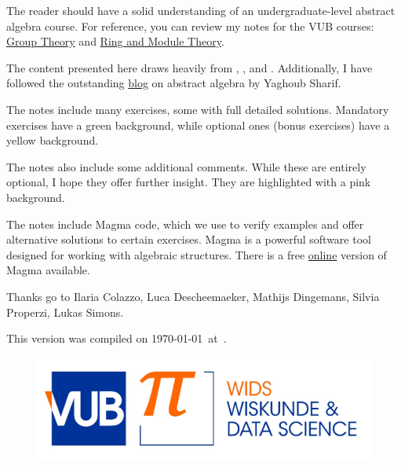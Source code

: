 The reader should have a solid understanding of an undergraduate-level abstract algebra course. For reference, you can review my notes for the VUB courses: \href{https://github.com/vendramin/group}{Group Theory} and \href{https://github.com/vendramin/rings}{Ring and Module Theory}.

The content presented here draws heavily from \cite{MR3308118}, \cite{MR1449137}, 
and \cite{MR798076}. Additionally, I have 
followed the outstanding \href{https://ysharifi.wordpress.com}{blog} on 
abstract algebra by Yaghoub Sharif.



The notes include many exercises, some with full detailed solutions. Mandatory exercises have a \colorbox{green!5!white}{green background}, while optional ones
(bonus exercises) have a \colorbox{yellow!15!white}{yellow background}.

The notes also include some additional comments. While these are entirely optional, I hope they offer further insight. They are highlighted with a \colorbox{red!5!white}{pink background}.

The notes include Magma code, which we use to verify examples and offer alternative solutions to certain exercises. Magma \cite{zbMATH01077111} is a powerful software tool designed for working with algebraic structures. There is a free \href{https://magma.maths.usyd.edu.au/calc/}{online} version of Magma available.


Thanks go to Ilaria Colazzo, 
Luca Descheemaeker, 
Mathijs Dingemans, 
Silvia Properzi, Lukas Simons.   

This version 
was compiled on \today~at~\currenttime.


 \begin{figure}[b]
     \includegraphics[scale=0.2]{VUB.jpg}
 \end{figure}


